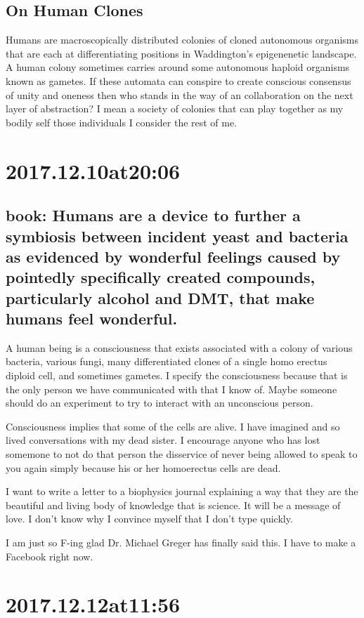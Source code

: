 \subsection*{ On Human Clones }
Humans are macroscopically distributed colonies of cloned autonomous organisms that are each at differentiating positions in Waddington's epigenenetic landscape. A human colony sometimes carries around some autonomous haploid organisms known as gametes. If these automata can conspire to create conscious consensus of unity and oneness then who stands in the way of an collaboration on the next layer of abstraction? I mean a society of colonies that can play together as my bodily self those individuals I consider the rest of me.

\section*{ 2017.12.10at20:06 }
\subsection*{ book: Humans are a device to further a symbiosis between incident yeast and bacteria as evidenced by wonderful feelings caused by pointedly specifically created compounds, particularly alcohol and DMT, that make humans feel wonderful. }
A human being is a consciousness that exists associated with a colony of various bacteria, various fungi, many differentiated clones of a single homo erectus diploid cell, and sometimes gametes. I specify the consciousness because that is the only person we have communicated with that I know of. Maybe someone should do an experiment to try to interact with an unconscious person.

Consciousness implies that some of the cells are alive. I have imagined and so lived conversations with my dead sister. I encourage anyone who has lost somemone to not do that person the disservice of never being allowed to speak to you again simply because his or her homoerectus cells are dead.

I want to write a letter to a biophysics journal explaining a way that they are the beautiful and living body of knowledge that is science. It will be a message of love. I don't know why I convince myself that I don't type quickly.

I am just so F-ing glad Dr. Michael Greger has finally said this. I have to make a Facebook right now.

\section*{ 2017.12.12at11:56 }
